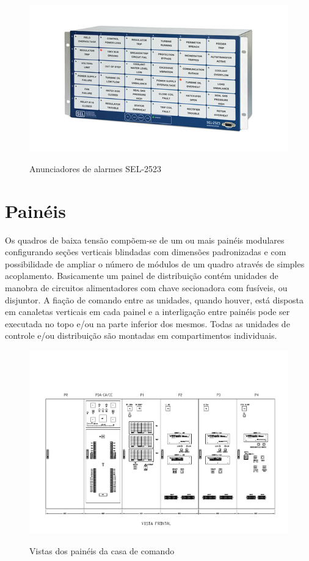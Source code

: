 \documentclass[a5paper]{ufsc-thesis}
\begin{document}
\begin{figure}[htb]
  \caption{Anunciadores de alarmes SEL-2523}
  \centering
  \includegraphics[width=16cm]{anunciador.jpg}
  \label{fig:anunciador}
\end{figure}

\section{Painéis}
Os quadros de baixa tensão compõem-se de um ou mais painéis modulares configurando seções verticais blindadas com dimensões padronizadas e com possibilidade de ampliar o número de módulos de um quadro através de simples acoplamento. Basicamente um painel de distribuição contém unidades de manobra de circuitos alimentadores com chave secionadora com fusíveis, ou disjuntor. A fiação de comando entre as unidades, quando houver, está disposta em canaletas verticais em cada painel e a interligação entre painéis pode ser executada no topo e/ou na parte inferior dos mesmos. Todas as unidades de controle e/ou distribuição são montadas em compartimentos individuais.

\begin{figure}[htb]
  \caption{Vistas dos painéis da casa de comando}
  \centering
  \includegraphics[width=16cm]{paineis.pdf}
  \label{fig:paineis}
\end{figure}
\end{document}
